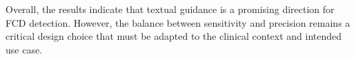 \documentclass[FCD_GNN.tex]{subfiles}
\begin{document}
Overall, the results indicate that textual guidance is a promising direction for
FCD detection.
However, the balance between sensitivity and precision remains a critical design
choice that must be adapted to the clinical context and intended use case.

\end{document}
